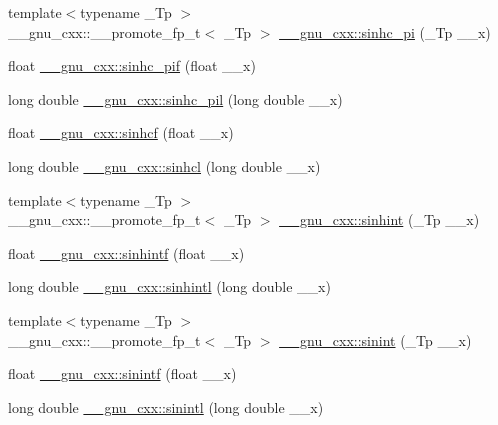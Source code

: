 \begin{DoxyCompactItemize}
\item 
{\footnotesize template$<$typename \+\_\+\+Tp $>$ }\\\+\_\+\+\_\+gnu\+\_\+cxx\+::\+\_\+\+\_\+promote\+\_\+fp\+\_\+t$<$ \+\_\+\+Tp $>$ \hyperlink{group__gnu__math__spec__func_ga56bea42a4701761e82567f7100d9ca5e}{\+\_\+\+\_\+gnu\+\_\+cxx\+::sinhc\+\_\+pi} (\+\_\+\+Tp \+\_\+\+\_\+x)
\item 
float \hyperlink{group__gnu__math__spec__func_ga26e54504db6541550266140f5264acbe}{\+\_\+\+\_\+gnu\+\_\+cxx\+::sinhc\+\_\+pif} (float \+\_\+\+\_\+x)
\item 
long double \hyperlink{group__gnu__math__spec__func_gaa572bf7633f457c86cef65bfd6ec4ad9}{\+\_\+\+\_\+gnu\+\_\+cxx\+::sinhc\+\_\+pil} (long double \+\_\+\+\_\+x)
\item 
float \hyperlink{group__gnu__math__spec__func_gadaa7ea78625cc2eeb70213a50719813d}{\+\_\+\+\_\+gnu\+\_\+cxx\+::sinhcf} (float \+\_\+\+\_\+x)
\item 
long double \hyperlink{group__gnu__math__spec__func_ga7467a001bb18ef8bff0a7e9927bab356}{\+\_\+\+\_\+gnu\+\_\+cxx\+::sinhcl} (long double \+\_\+\+\_\+x)
\item 
{\footnotesize template$<$typename \+\_\+\+Tp $>$ }\\\+\_\+\+\_\+gnu\+\_\+cxx\+::\+\_\+\+\_\+promote\+\_\+fp\+\_\+t$<$ \+\_\+\+Tp $>$ \hyperlink{group__gnu__math__spec__func_ga203079a2b70127f16a8c434ea55d4e06}{\+\_\+\+\_\+gnu\+\_\+cxx\+::sinhint} (\+\_\+\+Tp \+\_\+\+\_\+x)
\item 
float \hyperlink{group__gnu__math__spec__func_ga375ca3ceb1eafd678e298d0aea4bb3e6}{\+\_\+\+\_\+gnu\+\_\+cxx\+::sinhintf} (float \+\_\+\+\_\+x)
\item 
long double \hyperlink{group__gnu__math__spec__func_ga8b7f1a070be7233a3179e3cbded387ee}{\+\_\+\+\_\+gnu\+\_\+cxx\+::sinhintl} (long double \+\_\+\+\_\+x)
\item 
{\footnotesize template$<$typename \+\_\+\+Tp $>$ }\\\+\_\+\+\_\+gnu\+\_\+cxx\+::\+\_\+\+\_\+promote\+\_\+fp\+\_\+t$<$ \+\_\+\+Tp $>$ \hyperlink{group__gnu__math__spec__func_gaa588265d28710d36c7c4efa7d4f44ca4}{\+\_\+\+\_\+gnu\+\_\+cxx\+::sinint} (\+\_\+\+Tp \+\_\+\+\_\+x)
\item 
float \hyperlink{group__gnu__math__spec__func_ga8b63406fec50d7e00470521b82fb32a2}{\+\_\+\+\_\+gnu\+\_\+cxx\+::sinintf} (float \+\_\+\+\_\+x)
\item 
long double \hyperlink{group__gnu__math__spec__func_ga3ff83e5c5f1435064b6942ca8b7c8779}{\+\_\+\+\_\+gnu\+\_\+cxx\+::sinintl} (long double \+\_\+\+\_\+x)

\end{DoxyCompactItemize}
